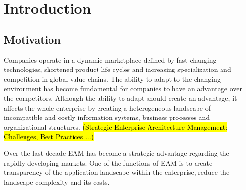 
\chapter{Introduction}\label{chapter:introduction}


\section{Motivation}

Companies operate in a dynamic marketplace defined by fast-changing technologies, shortened product life cycles and increasing specialization and competition in global value chains. The ability to adapt to the changing environment has become fundamental for companies to have an advantage over the competitors. Although the ability to adapt should create an advantage, it affects the whole enterprise by creating a heterogeneous landscape of incompatible and costly information systems, business processes and organizational structures. \hl{(Strategic Enterprise Architecture Management: Challenges, Best Practices ...)}

Over the last decade EAM has become a strategic advantage regarding the rapidly developing markets. One of the functions of EAM is to create transparency of the application landscape within the enterprise, reduce the landscape complexity and its costs.

